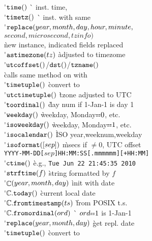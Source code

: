 \begin{tabbing}
\'$\mathop{\mathtt{time}}()$ \`  inst. time, \eq{} \\
\'$\mathop{\mathtt{timetz}}()$ \`  inst. with same  \\
\'$\mathop{\mathtt{replace}}(year, month, day, hour, minute,$\\
\> $second, microsecond, tzin\!f\!o)$ \\ \` new instance, indicated fields replaced \\
\'$\mathop{\mathtt{astimezone}}(tz)$ \` adjusted to timezome \\
\'$\mathop{\mathtt{utcoffset}}()$/$\mathop{\mathtt{dst}}()$/$\mathop{\mathtt{tzname}}()$ \\ \` calls same method on  with  \\
\'$\mathop{\mathtt{timetuple}}()$ \` convert$\!$ to$\!$  \\
\'$\mathop{\mathtt{utctimetuple}}()$ \` tzone adjusted to UTC \\
\'$\mathop{\mathtt{toordinal}}()$ \` day num if 1-Jan-1 is day 1 \\
\'$\mathop{\mathtt{weekday}}()$ \` weekday, Monday$\eq 0$, etc. \\
\'$\mathop{\mathtt{isoweekday}}()$ \` weekday, Monday$\eq 1$, etc. \\
\'$\mathop{\mathtt{isocalendar}}()$ \` ISO {\small year,weeknum,weekday} \\
\'$\mathop{\mathtt{isoformat}}({[}{sep}{]})$ \` msecs if $\!\neq\!0$, UTC offset \\ \` \texttt{\small{}YYYY$\!$-MM-DD[$\!sep\!$]HH$\!$:$\!$MM$\!$:$\!$SS[$\!$.mmmmmm]$\!$[+HH$\!$:$\!$MM]} \\
\'$\mathop{\mathtt{ctime}}()$ \` e.g., \verb.Tue Jun 22 21:45:35 2010. \\
\'$\mathop{\mathtt{strftime}}(f)$ \` string formatted by $f$ \\
\'$\mathop{\mathtt{\mathbb{C}}}(year, month, day)$ \` init with date \\
\'$\mathop{\mathtt{\mathbb{C}.today}}()$ \` current local date \\
\'$\mathop{\mathtt{\mathbb{C}.fromtimestamp}}(ts)$ \` from POSIX t.s. \\
\'$\mathop{\mathtt{\mathbb{C}.fromordinal}}(ord)$ \` $ord\eq 1$ is 1-Jan-1 \\
\'$\mathop{\mathtt{replace}}(year, month, day)$ \` get repl. date \\
\'$\mathop{\mathtt{timetuple}}()$ \` convert$\!$ to$\!$  \\

\end{tabbing}
